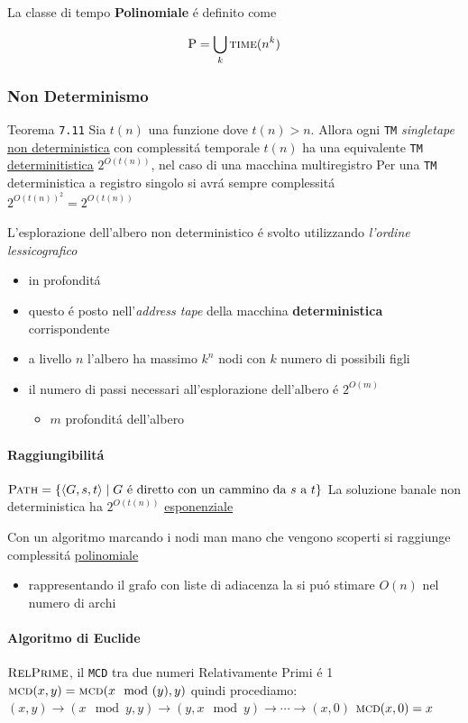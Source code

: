\documentclass[
                        12pt, %
                        a4paper, %
                        oneside, %
                        headinclude,footinclude, %
                        BCOR5mm, %
                  ]{scrartcl}
\begin{document}
La classe di tempo \textbf{Polinomiale} é definito come

\[\text{P} = \bigcup_k \textsc{time}(n^k)\]

\subsubsection{Non Determinismo}
\label{sec:orgb1e7166}
Teorema \texttt{7.11}
Sia \(t(n)\) una funzione dove \(t(n)>n\).
Allora ogni \texttt{TM} \emph{singletape} \uline{non deterministica} con complessitá temporale \(t(n)\) ha una equivalente \texttt{TM} \uline{determinitistica} \(2^{O(t(n))}\), nel caso di una macchina multiregistro
Per una \texttt{TM} deterministica a registro singolo si avrá sempre complessitá \(2^{O(t(n))}^2 = 2^{O(t(n))}\)

L'esplorazione dell'albero non deterministico é svolto utilizzando \emph{l'ordine lessicografico}
\begin{itemize}
\item in profonditá
\item questo é posto nell'\emph{address tape} della macchina \textbf{deterministica} corrispondente
\item a livello \(n\) l'albero ha massimo \(k^{n}\) nodi con \(k\) numero di possibili figli
\item il numero di passi necessari all'esplorazione dell'albero é \(2^{O(m)}\)
\begin{itemize}
\item \(m\) profonditá dell'albero
\end{itemize}
\end{itemize}
\paragraph{Raggiungibilitá}
\label{sec:orgae93b6f}
\(\textsc{Path} = \{ \langle G,s,t  \rangle \mid G \text{ é  diretto con un cammino da }s \text{ a } t \}\)
La soluzione banale non deterministica ha \(2^{O(t(n))}\) \uline{esponenziale}

Con un algoritmo marcando i nodi man mano che vengono scoperti si raggiunge complessitá \uline{polinomiale}
\begin{itemize}
\item rappresentando il grafo con liste di adiacenza la si puó stimare \(O(n)\) nel numero di archi
\end{itemize}
\paragraph{Algoritmo di Euclide}
\label{sec:orgeb68025}
\(\textsc{RelPrime}\), il \texttt{MCD} tra due numeri Relativamente Primi é 1
\(\textsc{mcd}(x,y) = \textsc{mcd}(x \mod(y), y)\)
quindi procediamo:
\((x,y) \to (x \mod{y}, y) \to (y, x\mod{y})\to \cdots \to (x,0)\)
\(\textsc{mcd}(x,0) = x\)
\end{document}
